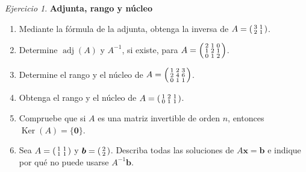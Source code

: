 \documentclass[12pt]{article}
\theoremstyle{remark}
\newtheorem{Ejer}[definicion]{Ejercicio}
\newcommand{\adj}{\operatorname{adj}}
\newcommand{\Ker}{\operatorname{Ker}}
\newcommand{\vect}[1]{\boldsymbol{#1}}
\begin{document}
\begin{Ejer}
\textbf{Adjunta, rango y núcleo}
\begin{enumerate}[resume=banco]
\item Mediante la fórmula de la adjunta, obtenga la inversa de $A=\begin{psmallmatrix}3&1\\2&1\end{psmallmatrix}$.
\item Determine $\adj(A)$ y $A^{-1}$, si existe, para $A=\begin{psmallmatrix}2&1&0\\1&2&1\\0&1&2\end{psmallmatrix}$.
\item Determine el rango y el núcleo de $A=\begin{psmallmatrix}1&2&3\\2&4&6\\0&1&1\end{psmallmatrix}$.
\item Obtenga el rango y el núcleo de $A=\begin{psmallmatrix}1&2&1\\0&1&1\end{psmallmatrix}$.
\item Compruebe que si $A$ es una matriz invertible de orden $n$, entonces $\Ker(A)=\{\vect0\}$.
\item Sea $A=\begin{psmallmatrix}1&1\\1&1\end{psmallmatrix}$ y $\vect b=\begin{psmallmatrix}2\\2\end{psmallmatrix}$. Describa todas las soluciones de $A\vect{x}=\vect b$ e indique por qué no puede usarse $A^{-1}\vect b$.
\end{enumerate}
\end{Ejer}
\end{document}
